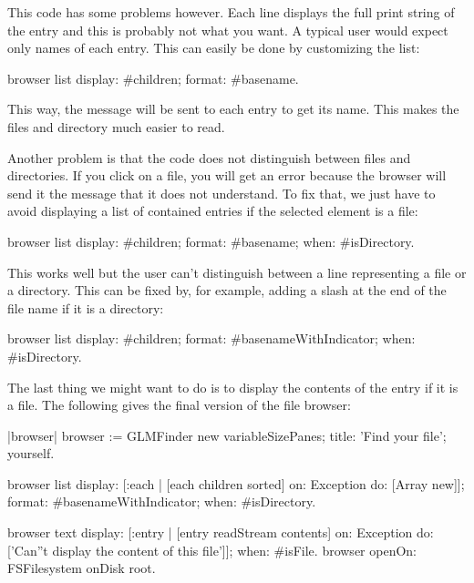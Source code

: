\documentclass[a4paper,10pt,twoside]{book}
\begin{document}
This code has some problems however. Each line displays the full print
string of the entry and this is probably not what you want. A typical
user would expect only names of each entry. This can easily be done by
customizing the list:

\begin{code}{}
browser list
  display: #children;
  format: #basename.
\end{code}

This way, the message  will be sent to each entry to get its
name. This makes the files and directory much easier to read.

Another problem is that the code does not distinguish between files
and directories. If you click on a file, you will get an error because
the browser will send it the message  that it does not
understand. To fix that, we just have to avoid displaying a list of
contained entries if the selected element is a file:

\begin{code}{}
browser list
  display: #children;
  format: #basename;
  when: #isDirectory.
\end{code}

This works well but the user can't distinguish between a line
representing a file or a directory. This can be fixed by, for example,
adding a slash at the end of the file name if it is a directory:

\begin{code}{}
browser list
  display: #children;
  format: #basenameWithIndicator;
  when: #isDirectory.
\end{code}

The last thing we might want to do is to display the contents of the
entry if it is a file. The following gives the final version of the
file browser:

\begin{code}{}
|browser|
browser := GLMFinder new
  variableSizePanes;
  title: 'Find your file';
  yourself.

browser list
  display: [:each | [each children sorted]
                       on: Exception
                       do: [Array new]];
  format: #basenameWithIndicator;
  when: #isDirectory.

browser text
  display: [:entry | [entry readStream contents]
                        on: Exception
                        do: ['Can''t display the content of this file']];
  when: #isFile.
browser openOn: FSFilesystem onDisk root.
\end{code}
\end{document}
